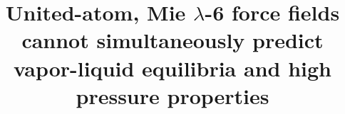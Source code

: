 \documentclass[preprint,letterpaper,floatfix,citeautoscript,aip,jcp]{revtex4-1}
\begin{document}
	
\title{United-atom, Mie $\lambda$-6 force fields cannot simultaneously predict vapor-liquid equilibria and high pressure properties}
\end{document}
